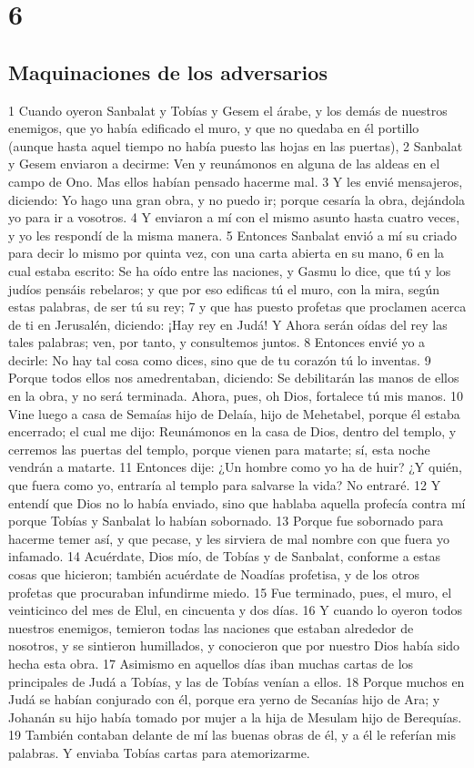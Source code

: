 \chapter{6}

\section*{Maquinaciones de los adversarios}


1 Cuando oyeron Sanbalat y Tobías y Gesem el árabe, y los demás de nuestros enemigos, que yo había edificado el muro, y que no quedaba en él portillo (aunque hasta aquel tiempo no había puesto las hojas en las puertas),
2 Sanbalat y Gesem enviaron a decirme: Ven y reunámonos en alguna de las aldeas en el campo de Ono. Mas ellos habían pensado hacerme mal.
3 Y les envié mensajeros, diciendo: Yo hago una gran obra, y no puedo ir; porque cesaría la obra, dejándola yo para ir a vosotros.
4 Y enviaron a mí con el mismo asunto hasta cuatro veces, y yo les respondí de la misma manera.
5 Entonces Sanbalat envió a mí su criado para decir lo mismo por quinta vez, con una carta abierta en su mano,
6 en la cual estaba escrito: Se ha oído entre las naciones, y Gasmu lo dice, que tú y los judíos pensáis rebelaros; y que por eso edificas tú el muro, con la mira, según estas palabras, de ser tú su rey; 
7 y que has puesto profetas que proclamen acerca de ti en Jerusalén, diciendo: ¡Hay rey en Judá! Y Ahora serán oídas del rey las tales palabras; ven, por tanto, y consultemos juntos.
8 Entonces envié yo a decirle: No hay tal cosa como dices, sino que de tu corazón tú lo inventas.
9 Porque todos ellos nos amedrentaban, diciendo: Se debilitarán las manos de ellos en la obra, y no será terminada. Ahora, pues, oh Dios, fortalece tú mis manos.
10 Vine luego a casa de Semaías hijo de Delaía, hijo de Mehetabel, porque él estaba encerrado; el cual me dijo: Reunámonos en la casa de Dios, dentro del templo, y cerremos las puertas del templo, porque vienen para matarte; sí, esta noche vendrán a matarte. 
11 Entonces dije: ¿Un hombre como yo ha de huir? ¿Y quién, que fuera como yo, entraría al templo para salvarse la vida? No entraré.
12 Y entendí que Dios no lo había enviado, sino que hablaba aquella profecía contra mí porque Tobías y Sanbalat lo habían sobornado.
13 Porque fue sobornado para hacerme temer así, y que pecase, y les sirviera de mal nombre con que fuera yo infamado.
14 Acuérdate, Dios mío, de Tobías y de Sanbalat, conforme a estas cosas que hicieron; también acuérdate de Noadías profetisa, y de los otros profetas que procuraban infundirme miedo.
15 Fue terminado, pues, el muro, el veinticinco del mes de Elul, en cincuenta y dos días.
16 Y cuando lo oyeron todos nuestros enemigos, temieron todas las naciones que estaban alrededor de nosotros, y se sintieron humillados, y conocieron que por nuestro Dios había sido hecha esta obra.
17 Asimismo en aquellos días iban muchas cartas de los principales de Judá a Tobías, y las de Tobías venían a ellos.
18 Porque muchos en Judá se habían conjurado con él, porque era yerno de Secanías hijo de Ara; y Johanán su hijo había tomado por mujer a la hija de Mesulam hijo de Berequías.
19 También contaban delante de mí las buenas obras de él, y a él le referían mis palabras. Y enviaba Tobías cartas para atemorizarme.

